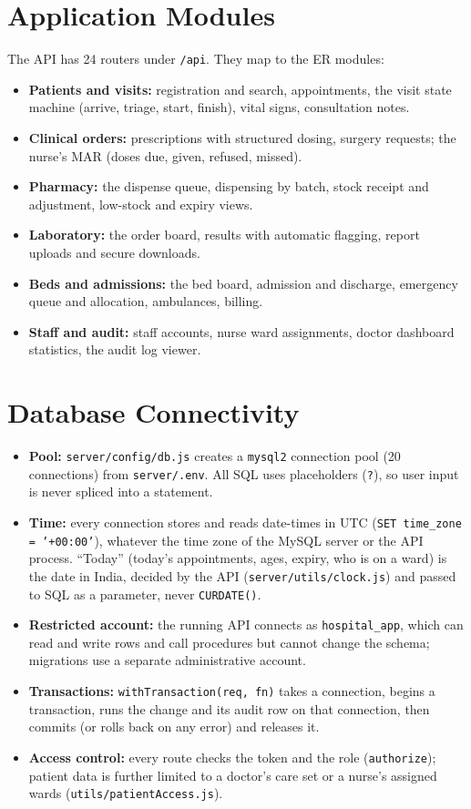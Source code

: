 \section{Application Modules}
The API has 24 routers under \texttt{/api}. They map to the ER modules:
\begin{itemize}
\item \textbf{Patients and visits:} registration and search, appointments, the visit state machine (arrive, triage, start, finish), vital signs, consultation notes.
\item \textbf{Clinical orders:} prescriptions with structured dosing, surgery requests; the nurse's MAR (doses due, given, refused, missed).
\item \textbf{Pharmacy:} the dispense queue, dispensing by batch, stock receipt and adjustment, low-stock and expiry views.
\item \textbf{Laboratory:} the order board, results with automatic flagging, report uploads and secure downloads.
\item \textbf{Beds and admissions:} the bed board, admission and discharge, emergency queue and allocation, ambulances, billing.
\item \textbf{Staff and audit:} staff accounts, nurse ward assignments, doctor dashboard statistics, the audit log viewer.
\end{itemize}

\section{Database Connectivity}
\begin{itemize}
\item \textbf{Pool:} \texttt{server/config/db.js} creates a \texttt{mysql2} connection pool (20 connections) from
\texttt{server/.env}. All SQL uses placeholders (\texttt{?}), so user input is never spliced into a statement.
\item \textbf{Time:} every connection stores and reads date-times in UTC (\texttt{SET time\_zone = '+00:00'}),
whatever the time zone of the MySQL server or the API process. ``Today'' (today's appointments, ages, expiry, who is
on a ward) is the date in India, decided by the API (\texttt{server/utils/clock.js}) and passed to SQL as a
parameter, never \texttt{CURDATE()}.
\item \textbf{Restricted account:} the running API connects as \texttt{hospital\_app}, which can read and write rows
and call procedures but cannot change the schema; migrations use a separate administrative account.
\item \textbf{Transactions:} \texttt{withTransaction(req, fn)} takes a connection, begins a transaction, runs the
change and its audit row on that connection, then commits (or rolls back on any error) and releases it.
\item \textbf{Access control:} every route checks the token and the role (\texttt{authorize}); patient data is
further limited to a doctor's care set or a nurse's assigned wards (\texttt{utils/patientAccess.js}).
\end{itemize}

